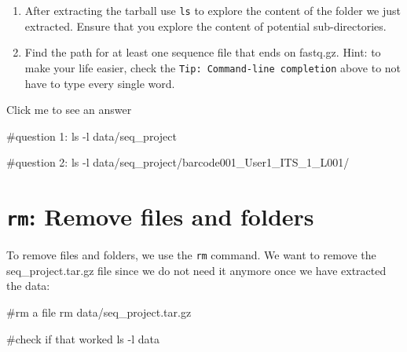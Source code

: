 \documentclass[
  letterpaper,
  DIV=11,
  numbers=noendperiod]{scrreprt}
\newenvironment{Shaded}{}{}
\newcommand{\AttributeTok}[1]{\textcolor[rgb]{0.84,0.23,0.29}{#1}}
\newcommand{\CommentTok}[1]{\textcolor[rgb]{0.42,0.45,0.49}{#1}}
\newcommand{\FunctionTok}[1]{\textcolor[rgb]{0.44,0.26,0.76}{#1}}
\newcommand{\NormalTok}[1]{\textcolor[rgb]{0.14,0.16,0.18}{#1}}
\providecommand{\tightlist}{%
  \setlength{\itemsep}{0pt}\setlength{\parskip}{0pt}}\usepackage{longtable,booktabs,array}
\begin{document}
\begin{tcolorbox}[enhanced jigsaw, title=\textcolor{quarto-callout-caution-color}{\faFire}\hspace{0.5em}{Exercise}, colframe=quarto-callout-caution-color-frame, opacitybacktitle=0.6, rightrule=.15mm, arc=.35mm, left=2mm, colbacktitle=quarto-callout-caution-color!10!white, bottomrule=.15mm, leftrule=.75mm, toprule=.15mm, opacityback=0, bottomtitle=1mm, colback=white, toptitle=1mm, breakable, titlerule=0mm, coltitle=black]

\begin{enumerate}
\def\labelenumi{\arabic{enumi}.}
\tightlist
\item
  After extracting the tarball use \texttt{ls} to explore the content of
  the folder we just extracted. Ensure that you explore the content of
  potential sub-directories.
\item
  Find the path for at least one sequence file that ends on fastq.gz.
  Hint: to make your life easier, check the
  \texttt{Tip:\ Command-line\ completion} above to not have to type
  every single word.
\end{enumerate}

Click me to see an answer

\begin{Shaded}
\begin{Highlighting}[]
\CommentTok{\#question 1:}
\FunctionTok{ls} \AttributeTok{{-}l}\NormalTok{ data/seq\_project}

\CommentTok{\#question 2:}
\FunctionTok{ls} \AttributeTok{{-}l}\NormalTok{ data/seq\_project/barcode001\_User1\_ITS\_1\_L001/}
\end{Highlighting}
\end{Shaded}

\end{tcolorbox}

\section{\texorpdfstring{\texttt{rm}: Remove files and
folders}{rm: Remove files and folders}}\label{rm-remove-files-and-folders}

To remove files and folders, we use the \texttt{rm} command. We want to
remove the seq\_project.tar.gz file since we do not need it anymore once
we have extracted the data:

\begin{Shaded}
\begin{Highlighting}[]
\CommentTok{\#rm a file}
\FunctionTok{rm}\NormalTok{ data/seq\_project.tar.gz}

\CommentTok{\#check if that worked}
\FunctionTok{ls} \AttributeTok{{-}l}\NormalTok{ data}
\end{Highlighting}
\end{Shaded}
\end{document}
